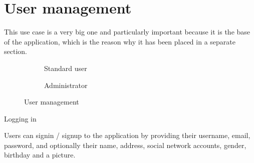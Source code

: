 \section{User management}
This use case is a very big one and particularly important because it is the base of the application, which is the reason why it has been placed in a separate section.

\begin{figure}[h]
  \centering
  \begin{subfigure}{0.45\linewidth}
    \caption{Standard user}
  \end{subfigure}
  \hfill
  \noindent
  \begin{subfigure}{0.45\linewidth}
    \centering
    \caption{Administrator}
  \end{subfigure}
  \caption{User management}
\end{figure}
\usecasedesc
{Logging in}
{
  Users can signin / signup to the application by providing their username, email, password, and optionally their name, address, social network accounts, gender, birthday and a picture.

}
